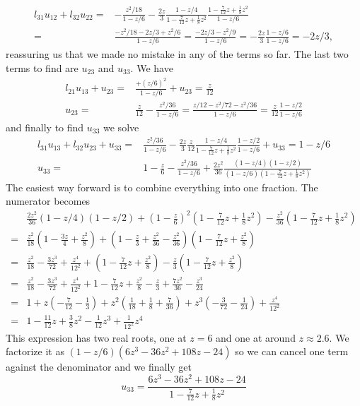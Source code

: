 \documentclass[10pt,a4paper]{article}
\begin{document}
\begin{align*}
  l_{31}u_{12} + l_{32}u_{22} =& -\frac{z^2/18}{1-z/6} - \frac{2z}{3}\frac{1 - z/4}{1 - \frac{7}{12}z + \frac{1}{8}z^2}\frac{1 - \frac{7}{12}z + \frac{1}{8}z^2}{1 - z/6} \\
  =& \frac{-z^2/18 - 2z/3 + z^2/6}{1-z/6} = \frac{-2z/3 -z^2/9}{1 - z/6} = -\frac{2z}{3}\frac{1-z/6}{1 - z/6} = -2z/3,
\end{align*}
reassuring us that we made no mistake in any of the terms so far.
The last two terms to find are $u_{23}$ and $u_{33}.$
We have
\begin{align*}
  l_{21}u_{13}  + u_{23} =& \frac{+(z/6)^2}{1-z/6} + u_{23} = \frac{z}{12} \\
  u_{23} =& \frac{z}{12} - \frac{z^2/36}{1-z/6}  = \frac{z/12 - z^2/72 - z^2/36}{1-z/6} = \frac{z}{12}\frac{1-z/2}{1-z/6}
\end{align*}
and finally to find $u_{33}$ we solve
\begin{align*}
  l_{31}u_{13} + l_{32}u_{23} + u_{33} =& \frac{z^2/36}{1 - z/6} - \frac{2z}{3}\frac{z}{12} \frac{1 - z/4}{1 - \frac{7}{12}z + \frac{1}{8}z^2}\frac{1 - z/2}{1 - z/6} + u_{33} = 1 - z/6 \\
  u_{33} =& 1 - \frac{z}{6} - \frac{z^2/36}{1-z/6} + \frac{2z^2}{36}\frac{(1 - z/4)(1-z/2)}{(1-z/6)(1 - \frac{7}{12}z + \frac{1}{8}z^2)}
\end{align*}
The easiest way forward is to combine everything into one fraction. The numerator becomes
\begin{align*}
  & \frac{2z^2}{36}(1-z/4)(1-z/2) + (1 - \frac{z}{6})^2(1-\frac{7}{12}z + \frac{1}{8}z^2) - \frac{z^2}{36}(1-\frac{7}{12}z + \frac{1}{8}z^2) \\
  =& \frac{z^2}{18}\left(1 - \frac{3z}{4} + \frac{z^2}{8}\right) + \left(1 - \frac{z}{3} + \frac{z^2}{36} - \frac{z^2}{36}\right)\left(1 - \frac{7}{12}z + \frac{z^2}{8}\right)  \\
  =& \frac{z^2}{18} - \frac{3z^3}{72} + \frac{z^4}{12^2} + \left(1 - \frac{7}{12}z + \frac{z^2}{8}\right) - \frac{z}{3}\left(1 - \frac{7}{12}z + \frac{z^2}{8}\right) \\
  =& \frac{z^2}{18} - \frac{3z^3}{72} + \frac{z^4}{12^2} + 1 - \frac{7}{12}z + \frac{z^2}{8} - \frac{z}{3} + \frac{7z^2}{36} - \frac{z^3}{24} \\
  =& 1 + z\left(-\frac{7}{12} - \frac{1}{3}\right) + z^2\left(\frac{1}{18} + \frac{1}{8} + \frac{7}{36}\right) + z^3\left(-\frac{3}{72} - \frac{1}{24}\right) + \frac{z^4}{12^2} \\
  =& 1 - \frac{11}{12}z + \frac{3}{8}z^2 - \frac{1}{12}z^3 + \frac{1}{12^2}z^4
\end{align*}
This expression has two real roots, one at $z=6$ and one at around $z\approx 2.6.$
We factorize it as $(1 - z/6)(6z^3 - 36z^2 + 108z - 24)$ so we can cancel one term against the denominator and we finally get
\begin{equation*}
  u_{33} = \frac{6z^3 - 36z^2 + 108z - 24}{1 - \frac{7}{12}z + \frac{1}{8}z^2}
\end{equation*}
\end{document}
